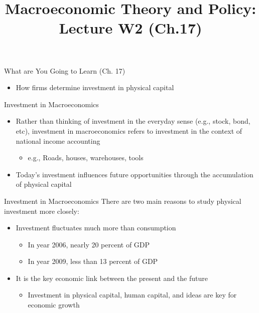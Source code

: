 \documentclass[aspectratio=1610]{beamer}
\title[Winter - Lecture 2] %
{Macroeconomic Theory and Policy: Lecture  W2 (Ch.17)}
\author[University of Toronto] %
{}
\date[] %
\begin{document}
\begin{frame}
  \titlepage
\end{frame}

\begin{frame}[wide]{What are You Going to Learn (Ch. 17)}
	\begin{itemize}
		\item How firms determine investment in physical capital
	\end{itemize}
\end{frame}

\begin{frame}[wide]{Investment in Macroeconomics}
	\begin{itemize}
		\item Rather than thinking of investment in the everyday sense (e.g., stock, bond, etc), investment in macroeconomics refers to investment in the context of national income accounting
		\vspace{1mm}
		\begin{itemize}
			\item e.g., Roads, houses, warehouses, tools
		\end{itemize}
		\vspace{3mm}
		\item Today’s investment influences future opportunities through the accumulation of physical capital
	\end{itemize}
\end{frame}

\begin{frame}[wide]{Investment in Macroeconomics}
	There are two main reasons to study physical investment more closely:
	\vspace{2mm}
	\begin{itemize}
		\item Investment fluctuates much more than consumption
		\begin{itemize}
			\item In year 2006, nearly 20 percent of GDP
			\item In year 2009, less than 13 percent of GDP
		\end{itemize}
		\item It is the key economic link between the present and the future
		\begin{itemize}
			\item Investment in physical capital, human capital, and ideas are key for economic growth
		\end{itemize}
	\end{itemize}
\end{frame}
\end{document}
